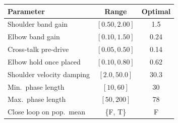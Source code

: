 \begin{tabular}{lcc}
\toprule
  Parameter & Range & Optimal \\
\midrule
  Shoulder band gain & $[0.50, 2.00]$ & 1.5 \\
  Elbow band gain & $[0.10, 1.50]$ & 0.24 \\
  Cross-talk pre-drive & $[0.05, 0.50]$ & 0.14 \\
  Elbow hold once placed & $[0.10, 0.80]$ & 0.62 \\
  Shoulder velocity damping & $[2.0, 50.0]$ & 30.3 \\
  Min.\ phase length & $[10, 60]$ & 30 \\
  Max.\ phase length & $[50, 200]$ & 78 \\
  Close loop on pop.\ mean & \{F, T\} & F \\
\bottomrule
\end{tabular}%
